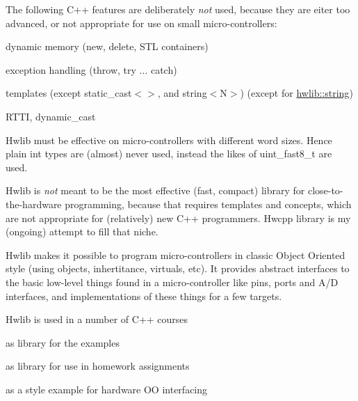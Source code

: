 The following C++ features are deliberately {\itshape not} used, because they are eiter too advanced, or not appropriate for use on small micro-\/controllers\+:
\begin{DoxyItemize}
\item dynamic memory (new, delete, S\+TL containers)
\item exception handling (throw, try ... catch)
\item templates (except static\+\_\+cast$<$$>$, and string$<$\+N$>$) (except for \hyperlink{classhwlib_1_1string}{hwlib\+::string})
\item R\+T\+TI, dynamic\+\_\+cast
\end{DoxyItemize}

Hwlib must be effective on micro-\/controllers with different word sizes. Hence plain int types are (almost) never used, instead the likes of uint\+\_\+fast8\+\_\+t are used.

Hwlib is {\itshape not} meant to be the most effective (fast, compact) library for close-\/to-\/the-\/hardware programming, because that requires templates and concepts, which are not appropriate for (relatively) new C++ programmers. Hwcpp library is my (ongoing) attempt to fill that niche.

Hwlib makes it possible to program micro-\/controllers in classic Object Oriented style (using objects, inhertitance, virtuals, etc). It provides abstract interfaces to the basic low-\/level things found in a micro-\/controller like pins, ports and A/D interfaces, and implementations of these things for a few targets.

Hwlib is used in a number of C++ courses
\begin{DoxyItemize}
\item as library for the examples
\item as library for use in homework assignments
\item as a style example for hardware OO interfacing
\end{DoxyItemize}

